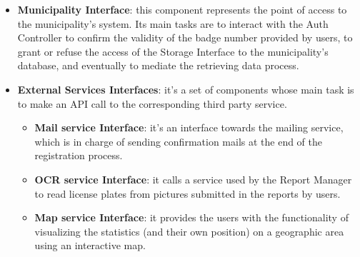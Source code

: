 \documentclass{report}
\begin{document}
\begin{itemize}
\item \textbf{Municipality Interface}: this component represents the point of access to the municipality's system. Its main tasks are to interact with the Auth Controller to confirm the validity of the badge number provided by users, to grant or refuse the access of the Storage Interface to the municipality's database, and eventually to mediate the retrieving data process.
\item \textbf{External Services Interfaces}: it's a set of components whose main task is to make an API call to the corresponding third party service.
    \begin{itemize}
        \item \textbf{Mail service Interface}: it's an interface towards the mailing service, which is in charge of sending confirmation mails at the end of the registration process.
        \item \textbf{OCR service Interface}: it calls a service used by the Report Manager to read license plates from pictures submitted in the reports by users.
        \item \textbf{Map service Interface}: it provides the users with the functionality of visualizing the statistics (and their own position) on a geographic area using an interactive map.
\end{itemize} 
\end{itemize}
\end{document}
